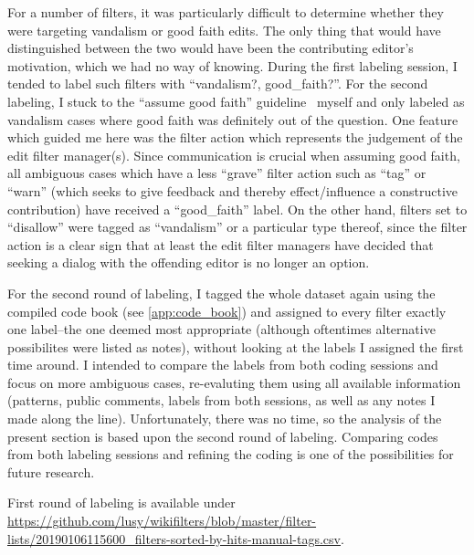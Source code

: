 For a number of filters, it was particularly difficult to determine whether they were targeting vandalism or good faith edits.
The only thing that would have distinguished between the two would have been the contributing editor's motivation, which we had no way of knowing.
During the first labeling session, I tended to label such filters with ``vandalism?, good\_faith?''.
For the second labeling, I stuck to the ``assume good faith'' guideline~\cite{Wikipedia:GoodFaith} myself
and only labeled as vandalism cases where good faith was definitely out of the question.
One feature which guided me here was the filter action which represents the judgement of the edit filter manager(s).
Since communication is crucial when assuming good faith, all ambiguous cases which have a less ``grave'' filter action such as ``tag'' or ``warn'' (which seeks to give feedback and thereby effect/influence a constructive contribution) have received a ``good\_faith'' label.
On the other hand, filters set to ``disallow'' were tagged as ``vandalism'' or a particular type thereof, since the filter action is a clear sign that at least the edit filter managers have decided that seeking a dialog with the offending editor is no longer an option. %

For the second round of labeling, I tagged the whole dataset again using the compiled code book (see \ref{app:code_book}) and assigned to every filter exactly one label–the one deemed most appropriate (although oftentimes alternative possibilites were listed as notes), without looking at the labels I assigned the first time around.
I intended to compare the labels from both coding sessions and focus on more ambiguous cases, re-evaluting them using all available information (patterns, public comments, labels from both sessions, as well as any notes I made along the line).
Unfortunately, there was no time, so the analysis of the present section is based upon the second round of labeling.
Comparing codes from both labeling sessions and refining the coding is one of the possibilities for future research. %

First round of labeling is available under \url{https://github.com/lusy/wikifilters/blob/master/filter-lists/20190106115600_filters-sorted-by-hits-manual-tags.csv}.

